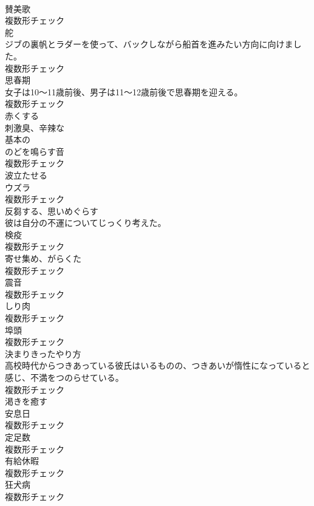\documentclass[8pt]{extreport}
\begin{document}
\begin{CJK}{UTF8}{min}
\\	[名詞]	賛美歌	
\\	複数形チェック
\\	[名詞]	舵	
\\	ジブの裏帆とラダーを使って、バックしながら船首を進みたい方向に向けました。	
\\	複数形チェック
\\	[名詞]	思春期	
\\	女子は10～11歳前後、男子は11～12歳前後で思春期を迎える。	
\\	複数形チェック
\\	[形容詞]	赤くする	
\\	[形容詞]	刺激臭、辛辣な	
\\	[形容詞]	基本の	
\\	[名詞]	のどを鳴らす音	
\\	複数形チェック
\\	[動詞]	波立たせる	
\\	[名詞]	ウズラ	
\\	複数形チェック
\\	[動詞]	反芻する、思いめぐらす	
\\	彼は自分の不運についてじっくり考えた。	
\\	[名詞]	検疫	
\\	複数形チェック
\\	[名詞]	寄せ集め、がらくた	
\\	複数形チェック
\\	[名詞]	震音	
\\	複数形チェック
\\	[名詞]	しり肉	
\\	複数形チェック
\\	[名詞]	埠頭	
\\	複数形チェック
\\	[名詞]	決まりきったやり方	
\\	高校時代からつきあっている彼氏はいるものの、つきあいが惰性になっていると感じ、不満をつのらせている。	
\\	複数形チェック
\\	[動詞]	渇きを癒す	
\\	[名詞]	安息日	
\\	複数形チェック
\\	[名詞]	定足数	
\\	複数形チェック
\\	[名詞]	有給休暇	
\\	複数形チェック
\\	[名詞]	狂犬病	
\\	複数形チェック

\end{CJK}
\end{document}
